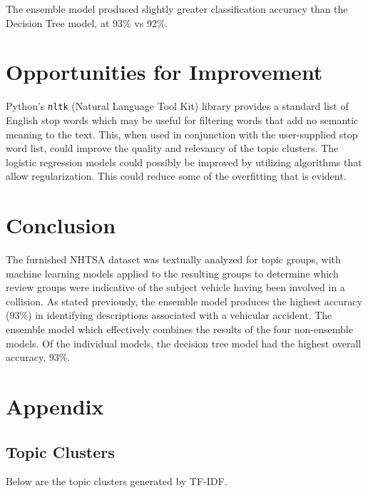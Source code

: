\documentclass[12pt]{article}
\begin{document}
The ensemble model produced slightly greater classification accuracy than the Decision Tree model, at 93\% vs 92\%.

\section{Opportunities for Improvement}
Python's \texttt{nltk} (Natural Language Tool Kit) library provides a standard list of English stop words which may be useful for filtering words that add no semantic meaning to the text. This, when used in conjunction with the user-supplied stop word list, could improve the quality and relevancy of the topic clusters.
The logistic regression models could possibly be improved by utilizing algorithms that allow regularization. This could reduce some of the overfitting that is evident.

\section{Conclusion}
The furnished NHTSA dataset was textually analyzed for topic groups, with machine learning models applied to the resulting groups to determine which review groups were indicative of the subject vehicle having been involved in a collision. As stated previously, the ensemble model produces the highest accuracy (93\%) in identifying descriptions associated with a vehicular accident. The ensemble model which effectively combines the results of the  four non-ensemble models.  Of the individual models, the decision tree model had the highest overall accuracy, 93\%.
\pagebreak
\section{Appendix}




\subsection{Topic Clusters}
Below are the topic clusters generated by TF-IDF.
\end{document}
